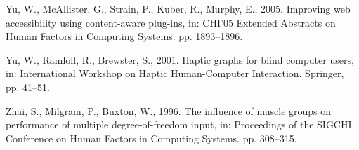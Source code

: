 \documentclass[
]{book}
\newlength{\cslhangindent}
\newlength{\cslentryspacingunit} %
\newenvironment{CSLReferences}[2] %
 {%
  \setlength{\parindent}{0pt}
  \ifodd #1
  \let\oldpar\par
  \def\par{\hangindent=\cslhangindent\oldpar}
  \fi
  \setlength{\parskip}{#2\cslentryspacingunit}
 }%
 {}
\begin{document}
\begin{CSLReferences}{1}{0}
\leavevmode{}%
Yu, W., McAllister, G., Strain, P., Kuber, R., Murphy, E., 2005. Improving web accessibility using content-aware plug-ins, in: CHI'05 Extended Abstracts on Human Factors in Computing Systems. pp. 1893--1896.

\leavevmode{}%
Yu, W., Ramloll, R., Brewster, S., 2001. Haptic graphs for blind computer users, in: International Workshop on Haptic Human-Computer Interaction. Springer, pp. 41--51.

\leavevmode{}%
Zhai, S., Milgram, P., Buxton, W., 1996. The influence of muscle groups on performance of multiple degree-of-freedom input, in: Proceedings of the SIGCHI Conference on Human Factors in Computing Systems. pp. 308--315.

\end{CSLReferences}
\end{document}
